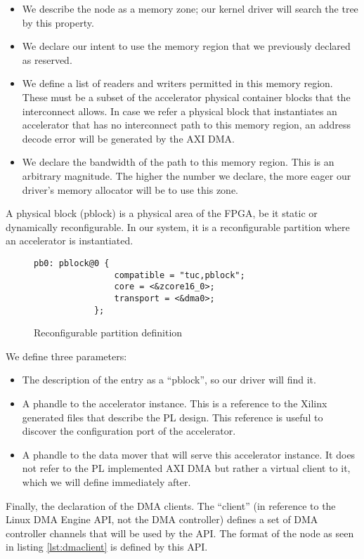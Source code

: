 \begin{itemize}
\item	We describe the node as a memory zone; our kernel driver will search the tree by this property.
\item	We declare our intent to use the memory region that we previously declared as reserved.
\item	We define a list of readers and writers permitted in this memory region.
	These must be a subset of the accelerator physical container blocks that the interconnect allows.
	In case we refer a physical block that instantiates an accelerator that has no interconnect
	path to this memory region, an address decode error will be generated by the AXI DMA.
\item	We declare the bandwidth of the path to this memory region.
	This is an arbitrary magnitude. The higher the number we declare,
	the more eager our driver's memory allocator will be to use this zone.
\end{itemize}

A physical block (pblock) is a physical area of the FPGA, be it static or dynamically reconfigurable.
In our system, it is a reconfigurable partition where an accelerator is instantiated.

\begin{figure}[ht!]
\centering
\begin{lstlisting}[style=basic]
		pb0: pblock@0 {
				compatible = "tuc,pblock";
				core = <&zcore16_0>;
				transport = <&dma0>;
			};
\end{lstlisting}
\caption{Reconfigurable partition definition}
\label{lst:pblock}
\end{figure}

We define three parameters:
\begin{itemize}
\item	The description of the entry as a ``pblock'', so our driver will find it.
\item	A phandle to the accelerator instance.  This is a reference to the Xilinx generated files
	that describe the PL design. This reference is useful to discover the configuration port
	of the accelerator.
\item	A phandle to the data mover that will serve this accelerator instance. It does not refer
	to the PL implemented AXI DMA but rather a virtual client to it,
	which we will define immediately after.
\end{itemize}

Finally, the declaration of the DMA clients.
The ``client'' (in reference to the Linux DMA Engine API, not the DMA controller) defines
a set of DMA controller channels that will be used by the API.
The format of the node as seen in listing \ref{lst:dmaclient} is defined by this API.

